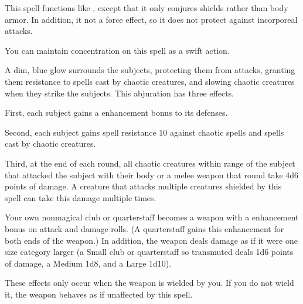 \begin{spelleffect}
  This spell functions like , except that it only conjures shields rather than body armor. In addition, it not a force effect, so it does not protect against incorporeal attacks.
\end{spelleffect}
\begin{spelleffect}
  You can maintain concentration on this spell as a swift action.
\end{spelleffect}

\begin{spelleffect}
  A dim, blue glow surrounds the subjects, protecting them from attacks, granting them resistance to spells cast by chaotic creatures, and slowing chaotic creatures when they strike the subjects. This abjuration has three effects.
  \par First, each subject gains a  enhancement bonus to its defenses.
  \par Second, each subject gains spell resistance 10 against chaotic spells and spells cast by chaotic creatures.
  \par Third, at the end of each round, all chaotic creatures within \rngclose range of the subject that attacked the subject with their body or a melee weapon that round take 4d6 points of damage. A creature that attacks multiple creatures shielded by this spell can take this damage multiple times.
\end{spelleffect}

\spelldur{\durshort}
\begin{spelleffect}
  Your own nonmagical club or quarterstaff becomes a weapon with a  enhancement bonus on attack and damage rolls. \spellbonusscalingdescription (A quarterstaff gains this enhancement for both ends of the weapon.) In addition, the weapon deals damage as if it were one size category larger (a Small club or quarterstaff so transmuted deals 1d6 points of damage, a Medium 1d8, and a Large 1d10).
\end{spelleffect}
\begin{spellnotes}
  These effects only occur when the weapon is wielded by you. If you do not wield it, the weapon behaves as if unaffected by this spell.
\end{spellnotes}

